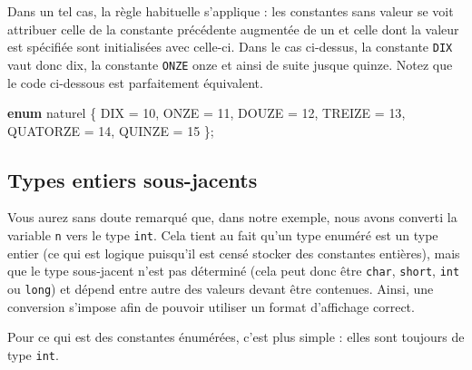 \documentclass[]{article}
\newenvironment{Shaded}{}{}
\newcommand{\KeywordTok}[1]{\textcolor[rgb]{0.00,0.44,0.13}{\textbf{{#1}}}}
\newcommand{\DecValTok}[1]{\textcolor[rgb]{0.25,0.63,0.44}{{#1}}}
\newcommand{\NormalTok}[1]{{#1}}
\begin{document}
Dans un tel cas, la règle habituelle s'applique : les constantes sans
valeur se voit attribuer celle de la constante précédente augmentée de
un et celle dont la valeur est spécifiée sont initialisées avec
celle-ci. Dans le cas ci-dessus, la constante \texttt{DIX} vaut donc
dix, la constante \texttt{ONZE} onze et ainsi de suite jusque quinze.
Notez que le code ci-dessous est parfaitement équivalent.

\begin{Shaded}
\begin{Highlighting}[]
\KeywordTok{enum} \NormalTok{naturel \{ DIX = }\DecValTok{10}\NormalTok{, ONZE = }\DecValTok{11}\NormalTok{, DOUZE = }\DecValTok{12}\NormalTok{, TREIZE = }\DecValTok{13}\NormalTok{, QUATORZE = }\DecValTok{14}\NormalTok{, QUINZE = }\DecValTok{15} \NormalTok{\};}
\end{Highlighting}
\end{Shaded}

\subsection{Types entiers
sous-jacents}\label{types-entiers-sous-jacents}

Vous aurez sans doute remarqué que, dans notre exemple, nous avons
converti la variable \texttt{n} vers le type \texttt{int}. Cela tient au
fait qu'un type enuméré est un type entier (ce qui est logique puisqu'il
est censé stocker des constantes entières), mais que le type sous-jacent
n'est pas déterminé (cela peut donc être \texttt{char}, \texttt{short},
\texttt{int} ou \texttt{long}) et dépend entre autre des valeurs devant
être contenues. Ainsi, une conversion s'impose afin de pouvoir utiliser
un format d'affichage correct.

Pour ce qui est des constantes énumérées, c'est plus simple : elles sont
toujours de type \texttt{int}.
\end{document}
